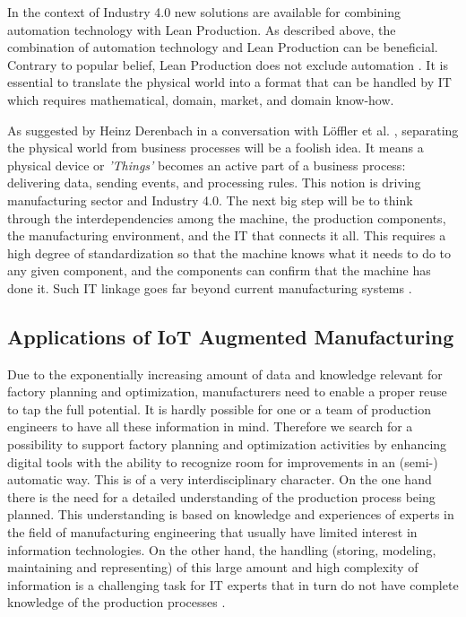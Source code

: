 In the context of Industry 4.0 new solutions are available for combining automation technology with Lean Production. As described above, the combination of automation technology and Lean Production can be beneficial. Contrary to popular belief, Lean Production does not exclude automation \cite{LEANKOLBERG}. It is essential to translate the physical world into a format that can be handled by \acs{IT} which requires mathematical, domain, market, and domain know-how. 

As suggested by Heinz Derenbach in a conversation with L{\"o}ffler et al. \cite{IOTMANU}, separating the physical world from business processes will be a foolish idea. It means a physical device or \textit{'Things'} becomes an active part of a business process: delivering data, sending events, and processing rules. This notion is driving manufacturing sector and Industry 4.0. The next big step will be to think through the interdependencies among the machine, the production components, the manufacturing environment, and the \acs{IT} that connects it all. This requires a high degree of standardization so that the machine knows what it needs to do to any given component, and the components can confirm that the machine has done it. Such \acs{IT} linkage goes far beyond current manufacturing systems \cite{IOTMANU}.

\subsection{Applications of IoT Augmented Manufacturing}
Due to the exponentially increasing amount of data and knowledge relevant for factory planning and optimization, manufacturers need to enable a proper reuse to tap the full potential. It is hardly possible for one or a team of production engineers to have all these information in mind. Therefore we search for a possibility to support factory planning and optimization activities by enhancing digital tools with the ability to recognize room for improvements in an (semi-) automatic way. This is of a very interdisciplinary character. On the one hand there is the need for a detailed understanding of the production process being planned. This understanding is based on knowledge and experiences of experts in the field of manufacturing engineering that usually have limited interest in information technologies. On the other hand, the
handling (storing, modeling, maintaining and representing) of this large amount and high complexity of information is a challenging task for IT experts that in turn do not have complete knowledge of the production processes \cite{LANDHERR} \cite{IOTCLOUD}.

